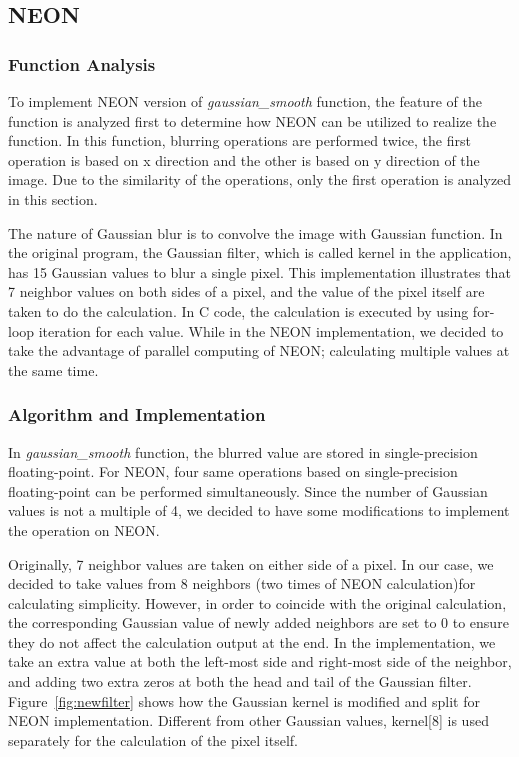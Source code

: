 \subsection{NEON}
\subsubsection{Function Analysis}
To implement NEON version of \textit{gaussian\_smooth} function, the feature of the function is analyzed first to determine how NEON can be utilized to
realize the function. In this function, blurring operations are performed twice, the first operation is based on x direction and the other is based on y direction of the image. Due to the similarity of the operations, only the first operation is analyzed in this section. 

The nature of Gaussian blur is to convolve the image with Gaussian function. In the original program, the Gaussian filter, which is called kernel in the application, has 15 Gaussian values to blur a single pixel. This implementation illustrates that 7 neighbor values on both sides of a pixel, and the value of the pixel itself are taken to do the calculation. In C code, the calculation is executed by using for-loop iteration for each value. While in the NEON implementation, we decided to take the advantage of parallel computing of NEON; calculating multiple values at the same time.

\subsubsection{Algorithm and Implementation}
In \textit{gaussian\_smooth} function, the blurred value are stored in single-precision floating-point. For NEON, four same operations based on single-precision floating-point can be performed simultaneously. Since the number of Gaussian values is not a multiple of 4, we decided to have some modifications to implement the operation on NEON. 

Originally, 7 neighbor values are taken on either side of a pixel. In our case, we decided to take values from 8 neighbors (two times of NEON calculation)for calculating simplicity. However, in order to coincide with the original calculation, the corresponding Gaussian value of newly added neighbors are set to 0 to ensure they do not affect the calculation output at the end. In the implementation, we take an extra value at both the left-most side and right-most side of the neighbor, and adding two extra zeros at both the head and tail of the Gaussian filter. Figure~\ref{fig:newfilter} shows how the Gaussian kernel is modified and split for NEON implementation. Different from other Gaussian values, kernel[8] is used separately for the calculation of the pixel itself. 

